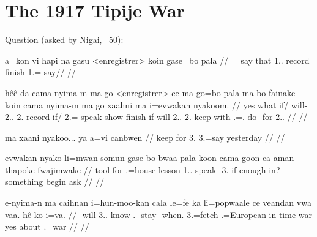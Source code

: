 \chapter{The 1917 Tipije War}
%


Question (asked by Nigai, ~50):

\pex \label{ques}
\a 
\begingl
\gla a=kon vi hapi na gasu <enregistrer> koin gase=bo pala
// = say that  1.. record finish 1.= say// \glft  {}
//\endgl

\a
\begingl
\gla hêê da cama nyima-m ma go <enregistrer> ce-ma go=bo pala ma bo fainake koin cama nyima-m ma go xaahni ma i=evwakan nyakoom.
// \glb yes what if/ will-2..  2. record if/ 2.= speak   show finish if will-2..  2. keep with .=.-do- for-2..
// \glft {}
// \endgl

\a
\begingl
\gla ma xaani nyakoo... ya a=vi canbwen
// \glb {} keep for 3. 3.=say yesterday
// \glft {}
// \endgl

\a
\begingl %
\gla evwakan nyako li=mwan somun gase bo bwaa pala koon cama goon ca aman thapoke fwajimwake
// \glb tool for .=house lesson 1..   speak -3. if enough in? something begin ask
// \glft {}
// \endgl

\a
\begingl
\gla e-nyima-n ma caihnan i=hun-moo-kan cala le=fe ka li=popwaale ce veandan vwa vaa. hê ko i=va. 
// \glb {}-will-3..  know .--stay- when. 3.=fetch  .=European in time  war yes about .=war
// \glft {}
// \endgl


